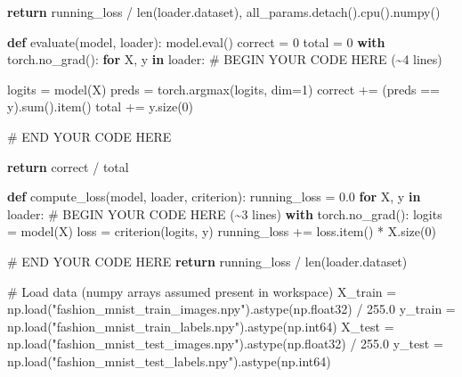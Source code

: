 \documentclass[
  letterpaper,
  DIV=11,
  numbers=noendperiod]{scrartcl}
\newenvironment{Shaded}{\begin{snugshade}}{\end{snugshade}}
\newcommand{\BuiltInTok}[1]{\textcolor[rgb]{0.00,0.23,0.31}{#1}}
\newcommand{\CommentTok}[1]{\textcolor[rgb]{0.37,0.37,0.37}{#1}}
\newcommand{\ControlFlowTok}[1]{\textcolor[rgb]{0.00,0.23,0.31}{\textbf{#1}}}
\newcommand{\DecValTok}[1]{\textcolor[rgb]{0.68,0.00,0.00}{#1}}
\newcommand{\FloatTok}[1]{\textcolor[rgb]{0.68,0.00,0.00}{#1}}
\newcommand{\KeywordTok}[1]{\textcolor[rgb]{0.00,0.23,0.31}{\textbf{#1}}}
\newcommand{\NormalTok}[1]{\textcolor[rgb]{0.00,0.23,0.31}{#1}}
\newcommand{\OperatorTok}[1]{\textcolor[rgb]{0.37,0.37,0.37}{#1}}
\newcommand{\RegionMarkerTok}[1]{\textcolor[rgb]{0.00,0.23,0.31}{#1}}
\newcommand{\StringTok}[1]{\textcolor[rgb]{0.13,0.47,0.30}{#1}}
\begin{document}
\begin{Shaded}
\begin{Highlighting}[]
    \ControlFlowTok{return}\NormalTok{ running\_loss }\OperatorTok{/} \BuiltInTok{len}\NormalTok{(loader.dataset), all\_params.detach().cpu().numpy()}


\KeywordTok{def}\NormalTok{ evaluate(model, loader):}
\NormalTok{    model.}\BuiltInTok{eval}\NormalTok{()}
\NormalTok{    correct }\OperatorTok{=} \DecValTok{0}
\NormalTok{    total }\OperatorTok{=} \DecValTok{0}
    \ControlFlowTok{with}\NormalTok{ torch.no\_grad():}
        \ControlFlowTok{for}\NormalTok{ X, y }\KeywordTok{in}\NormalTok{ loader:}
            \CommentTok{\# }\RegionMarkerTok{BEGIN}\CommentTok{ YOUR CODE HERE (\textasciitilde{}4 lines)}

\NormalTok{            logits }\OperatorTok{=}\NormalTok{ model(X)}
\NormalTok{            preds }\OperatorTok{=}\NormalTok{ torch.argmax(logits, dim}\OperatorTok{=}\DecValTok{1}\NormalTok{)}
\NormalTok{            correct }\OperatorTok{+=}\NormalTok{ (preds }\OperatorTok{==}\NormalTok{ y).}\BuiltInTok{sum}\NormalTok{().item()}
\NormalTok{            total }\OperatorTok{+=}\NormalTok{ y.size(}\DecValTok{0}\NormalTok{)}



            \CommentTok{\# }\RegionMarkerTok{END}\CommentTok{ YOUR CODE HERE}

    \ControlFlowTok{return}\NormalTok{ correct }\OperatorTok{/}\NormalTok{ total}


\KeywordTok{def}\NormalTok{ compute\_loss(model, loader, criterion):}
\NormalTok{    running\_loss }\OperatorTok{=} \FloatTok{0.0}
    \ControlFlowTok{for}\NormalTok{ X, y }\KeywordTok{in}\NormalTok{ loader:}
        \CommentTok{\# }\RegionMarkerTok{BEGIN}\CommentTok{ YOUR CODE HERE (\textasciitilde{}3 lines)}
        \ControlFlowTok{with}\NormalTok{ torch.no\_grad():}
\NormalTok{            logits }\OperatorTok{=}\NormalTok{ model(X)}
\NormalTok{            loss }\OperatorTok{=}\NormalTok{ criterion(logits, y)}
\NormalTok{            running\_loss }\OperatorTok{+=}\NormalTok{ loss.item() }\OperatorTok{*}\NormalTok{ X.size(}\DecValTok{0}\NormalTok{)}

        \CommentTok{\# }\RegionMarkerTok{END}\CommentTok{ YOUR CODE HERE}
    \ControlFlowTok{return}\NormalTok{ running\_loss }\OperatorTok{/} \BuiltInTok{len}\NormalTok{(loader.dataset)}

\CommentTok{\# Load data (numpy arrays assumed present in workspace)}
\NormalTok{X\_train }\OperatorTok{=}\NormalTok{ np.load(}\StringTok{"fashion\_mnist\_train\_images.npy"}\NormalTok{).astype(np.float32) }\OperatorTok{/} \FloatTok{255.0}
\NormalTok{y\_train }\OperatorTok{=}\NormalTok{ np.load(}\StringTok{"fashion\_mnist\_train\_labels.npy"}\NormalTok{).astype(np.int64)}
\NormalTok{X\_test }\OperatorTok{=}\NormalTok{ np.load(}\StringTok{"fashion\_mnist\_test\_images.npy"}\NormalTok{).astype(np.float32) }\OperatorTok{/} \FloatTok{255.0}
\NormalTok{y\_test }\OperatorTok{=}\NormalTok{ np.load(}\StringTok{"fashion\_mnist\_test\_labels.npy"}\NormalTok{).astype(np.int64)}


\end{Highlighting}
\end{Shaded}
\end{document}
